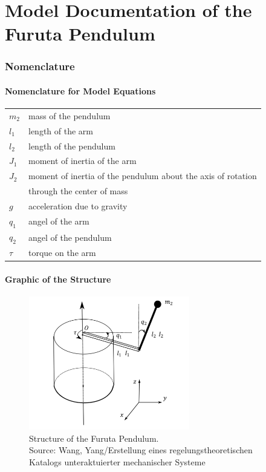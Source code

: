 \documentclass[10pt,a4paper]{article}
\begin{document}
	\part*{Model Documentation of the \\ Furuta Pendulum} %
	
	
	\section{Nomenclature} %
	\subsection{Nomenclature for Model Equations} %
	
	\begin{tabular}{ll}
		$m_2$ & mass of the pendulum \\
		$l_1$ & length of the arm \\		
		$l_2$ & length of the pendulum \\
		$J_1$ & moment of inertia of the arm \\
		$J_2$ & moment of inertia of the pendulum about the axis of rotation \\
		& through the center of mass \\
		$g$ & acceleration due to gravity \\
		$q_1$ & angel of the arm \\
		$q_2$ & angel of the pendulum \\
		$\tau$ & torque on the arm\\	
	\end{tabular}
	 
	
	\subsection{Graphic of the Structure}	
	\begin{figure}[H]
		\centering
		\captionsetup{justification=centering, margin=1cm}
		\includegraphics[width=70mm]{furuta.pdf}
		\caption{Structure of the Furuta Pendulum. \\ \footnotesize{Source: Wang, Yang/Erstellung eines regelungstheoretischen Katalogs unteraktuierter mechanischer Systeme}}
	\end{figure}
	
\end{document}
